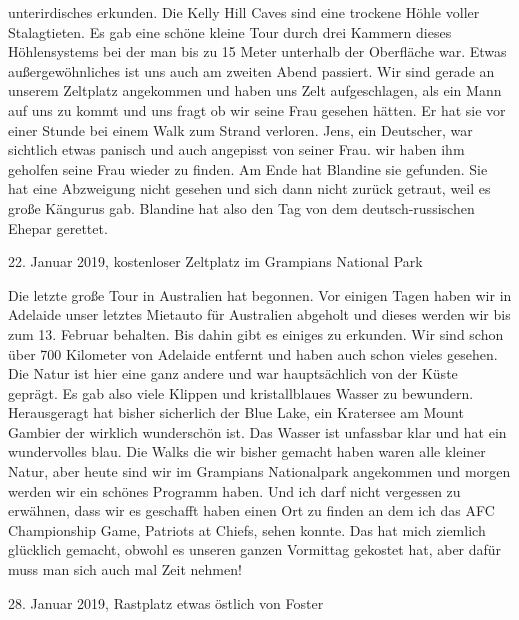 \documentclass[11pt]{book}
\begin{document}
unterirdisches erkunden. Die Kelly Hill Caves sind eine trockene Höhle voller Stalagtieten. Es gab eine schöne kleine Tour durch 
drei Kammern dieses Höhlensystems bei der man bis zu 15 Meter unterhalb der Oberfläche war.
Etwas außergewöhnliches ist uns auch am zweiten Abend passiert. Wir sind gerade an unserem Zeltplatz angekommen und haben uns 
Zelt aufgeschlagen, als ein Mann auf uns zu kommt und uns fragt ob wir seine Frau gesehen hätten. Er hat sie vor einer Stunde 
bei einem Walk zum Strand verloren. Jens, ein Deutscher, war sichtlich etwas panisch und auch angepisst von seiner Frau. wir haben
ihm geholfen seine Frau wieder zu finden. Am Ende hat Blandine sie gefunden. Sie hat eine Abzweigung nicht gesehen und sich 
dann nicht zurück getraut, weil es große Kängurus gab. Blandine hat also den Tag von dem deutsch-russischen Ehepar gerettet.

22. Januar 2019, kostenloser Zeltplatz im Grampians National Park

Die letzte große Tour in Australien hat begonnen. Vor einigen Tagen haben wir in Adelaide unser letztes Mietauto für Australien
abgeholt und dieses werden wir bis zum 13. Februar behalten. Bis dahin gibt es einiges zu erkunden. Wir sind schon über 700 Kilometer 
von Adelaide entfernt und haben auch schon vieles gesehen. Die Natur ist hier eine ganz andere und war hauptsächlich von der Küste 
geprägt. Es gab also viele Klippen und kristallblaues Wasser zu bewundern. Herausgeragt hat bisher sicherlich der Blue Lake, ein 
Kratersee am Mount Gambier der wirklich wunderschön ist. Das Wasser ist unfassbar klar und hat ein wundervolles blau. Die Walks 
die wir bisher gemacht haben waren alle kleiner Natur, aber heute sind wir im Grampians Nationalpark angekommen und morgen werden 
wir ein schönes Programm haben. Und ich darf nicht vergessen zu erwähnen, dass wir es geschafft haben einen Ort zu finden an dem 
ich das AFC Championship Game, Patriots at Chiefs, sehen konnte. Das hat mich ziemlich glücklich gemacht, obwohl es unseren ganzen 
Vormittag gekostet hat, aber dafür muss man sich auch mal Zeit nehmen!

28. Januar 2019, Rastplatz etwas östlich von Foster
\end{document}
